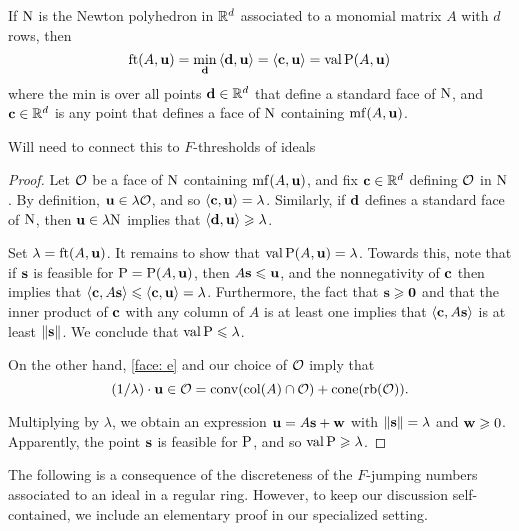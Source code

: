 \documentclass[11pt]{amsart}
\begin{document}
\begin{proposition}
\label{FT descriptions: P}
  If $\mathrm{N}$ is the Newton polyhedron in $\mathbb{R}^d$ associated to a monomial matrix $A$ with $d$ rows, then
\[ \operatorname{ft}(A, \mathbf{u}) = \min_{\mathbf{d}} \, \langle \mathbf{d}, \mathbf{u} \rangle = \langle \mathbf{c}, \mathbf{u} \rangle = \operatorname{val} \mathrm{P}(A, \mathbf{u}) \] where the min is over all points $\mathbf{d} \in \mathbb{R}^d$ that define a standard face of $\mathrm{N}$, and $\mathbf{c} \in \mathbb{R}^d$ is any point that defines a face of $\mathrm{N}$ containing $\operatorname{mf}(A, \mathbf{u})$. 
\end{proposition}

\alert[inline]{Will need to connect this to $F$-thresholds of ideals}

\begin{proof} Let $\mathcal{O}$ be a face of $\mathrm{N}$ containing $\operatorname{mf}(A,\mathbf{u})$, and fix $\mathbf{c} \in \mathbb{R}^d$ defining $\mathcal{O}$ in $\mathrm{N}$.  By definition, $\mathbf{u} \in \lambda \mathcal{O}$, and so $\langle \mathbf{c}, \mathbf{u} \rangle = \lambda$.    Similarly, if $\mathbf{d}$ defines a standard face of $\mathrm{N}$, then $\mathbf{u} \in \lambda \mathrm{N}$ implies that $\langle \mathbf{d}, \mathbf{u} \rangle \geqslant \lambda$.

Set $\lambda = \operatorname{ft}(A, \mathbf{u})$.  It remains to show that $\operatorname{val} \mathrm{P}(A, \mathbf{u}) = \lambda$.  Towards this, note that if $\mathbf{s}$ is feasible for $\mathrm{P} = \mathrm{P}(A, \mathbf{u})$, then $A \mathbf{s} \leqslant \mathbf{u}$, and the nonnegativity of $\mathbf{c}$ then implies that  $\langle \mathbf{c}, A \mathbf{s} \rangle \leqslant \langle \mathbf{c}, \mathbf{u} \rangle = \lambda$.  Furthermore, the fact that $\mathbf{s} \geqslant \mathbf{0}$ and that the inner product of $\mathbf{c}$ with any column of $A$ is at least one implies that $\langle \mathbf{c}, A \mathbf{s} \rangle$ is at least $\| \mathbf{s} \|$.  We conclude that $\operatorname{val} \mathrm{P} \leqslant \lambda$.  

On the other hand, \eqref{face: e} and our choice of $\mathcal{O}$ imply that 
\begin{equation}
\label{cone containment: e}
 (1/\lambda) \cdot \mathbf{u} \in \mathcal{O} = \operatorname{conv}(\operatorname{col}(A) \cap \mathcal{O}) + \operatorname{cone}(\operatorname{rb}(\mathcal{O})).
\end{equation}

Multiplying by $\lambda$, we obtain an expression $\mathbf{u} = A \mathbf{s} + \mathbf{w}$ with $\| \mathbf{s} \| = \lambda$ and $\mathbf{w} \geqslant 0$.  Apparently, the point $\mathbf{s}$ is feasible for $\mathrm{P}$, and so $\operatorname{val} \mathrm{P} \geqslant \lambda$.
\end{proof}


The following is a consequence of the discreteness of the $F$-jumping numbers associated to an ideal in a regular ring.  However, to keep our discussion self-contained, we include an elementary proof in our specialized setting.
\end{document}
